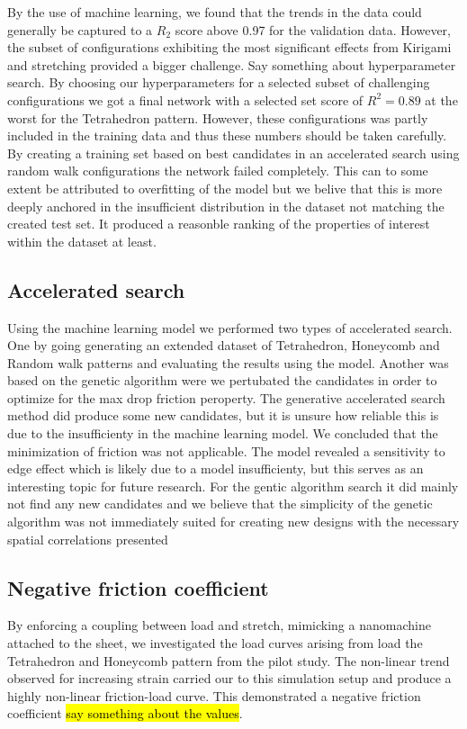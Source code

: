  By the use of machine learning, we found that the
trends in the data could generally be captured to a $R_2$ score above 0.97 for
the validation data. However, the subset of configurations exhibiting the most
significant effects from Kirigami and stretching provided a bigger challenge.
Say something about hyperparameter search. By choosing our hyperparameters for a
selected subset of challenging configurations we got a final network with a
selected set score of $R^2 = 0.89$ at the worst for the Tetrahedron pattern.
However, these configurations was partly included in the training data and thus these numbers should be taken carefully. By creating a training set based on best candidates in an accelerated search using random walk configurations the network failed completely. This can to some extent be attributed to overfitting of the model but we belive that this is more deeply anchored in the insufficient distribution in the dataset not matching the created test set. It produced a reasonble ranking of the properties of interest within the dataset at least.


\subsection{Accelerated search}
Using the machine learning model we performed two types of accelerated search. One by going generating an extended dataset of Tetrahedron, Honeycomb and Random walk patterns and evaluating the results using the model. Another was based on the genetic algorithm were we pertubated the candidates in order to optimize for the max drop friction peroperty. The generative accelerated search method did produce some new candidates, but it is unsure how reliable this is due to the insufficienty in the machine learning model. We concluded that the minimization of friction was not applicable. The model revealed a sensitivity to edge effect which is likely due to a model insufficienty, but this serves as an interesting topic for future research. For the gentic algorithm search it did mainly not find any new candidates and we believe that the simplicity of the genetic algorithm was not immediately suited for creating new designs with the necessary spatial correlations presented 



\subsection{Negative friction coefficient}
By enforcing a coupling between load and stretch, mimicking a nanomachine attached to the sheet, we investigated the load curves arising from load the Tetrahedron and Honeycomb pattern from the pilot study. The non-linear trend observed for increasing strain carried our to this simulation setup and produce a highly non-linear friction-load curve. This demonstrated a negative friction coefficient \hl{say something about the values}.



